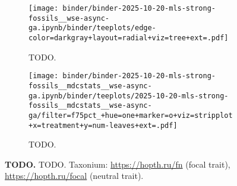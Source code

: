 \begin{figure}

\begin{minipage}[t]{0.7\linewidth}%
\vspace*{0pt}%
\begin{subfigure}[t]{0.5\linewidth}
    \centering
    \texttt{[image: binder/binder-2025-10-20-mls-strong-fossils\_\_wse-async-ga.ipynb/binder/teeplots/edge-color=darkgray+layout=radial+viz=tree+ext=.pdf]}
    \caption{\footnotesize
    TODO.
    }
    \label{fig:use-case-mls:phylo}
\end{subfigure}%
\begin{subfigure}[t]{0.5\linewidth}
    \centering
    \texttt{[image: binder/binder-2025-10-20-mls-strong-fossils\_\_mdcstats\_\_wse-async-ga.ipynb/binder/teeplots/2025-10-20-mls-strong-fossils\_\_mdcstats\_\_wse-async-ga/filter=f75pct\_+hue=one+marker=o+viz=stripplot+x=treatment+y=num-leaves+ext=.pdf]}
    \caption{\footnotesize
    TODO.
    }
    \label{fig:use-case-mls:cladesize}
\end{subfigure}
\end{minipage}%
\begin{minipage}[t]{0.3\linewidth}%
\vspace{0pt}%
\caption{%
\textbf{TODO.}
\footnotesize
TODO.
Taxonium: \url{https://hopth.ru/fn} (focal trait), \url{https://hopth.ru/focal} (neutral trait).
}
\label{fig:use-case-mls}
\end{minipage}
\end{figure}
